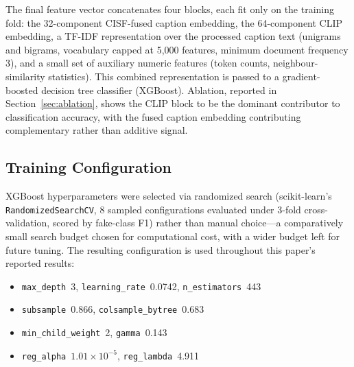 \documentclass[conference,a4paper]{IEEEtran}
\begin{document}
The final feature vector concatenates four blocks, each fit only on the
training fold: the 32-component CISF-fused caption embedding, the 64-component
CLIP embedding, a TF-IDF representation over the processed caption text
(unigrams and bigrams, vocabulary capped at 5{,}000 features, minimum document
frequency 3), and a small set of auxiliary numeric features (token counts,
neighbour-similarity statistics). This combined representation is passed to a
gradient-boosted decision tree classifier (XGBoost). Ablation, reported in
Section~\ref{sec:ablation}, shows the CLIP block to be the dominant
contributor to classification accuracy, with the fused caption embedding
contributing complementary rather than additive signal.

\subsection{Training Configuration}
\label{sec:training}

XGBoost hyperparameters were selected via randomized search (scikit-learn's
\texttt{RandomizedSearchCV}, 8 sampled configurations evaluated under 3-fold
cross-validation, scored by fake-class F1) rather than manual choice---a
comparatively small search budget chosen for computational cost, with a wider
budget left for future tuning. The resulting configuration is used throughout
this paper's reported results:

\begin{itemize}
\item \texttt{max\_depth}~3, \texttt{learning\_rate}~0.0742,
\texttt{n\_estimators}~443
\item \texttt{subsample}~0.866, \texttt{colsample\_bytree}~0.683
\item \texttt{min\_child\_weight}~2, \texttt{gamma}~0.143
\item \texttt{reg\_alpha}~$1.01\times10^{-5}$, \texttt{reg\_lambda}~4.911
\end{itemize}
\end{document}
